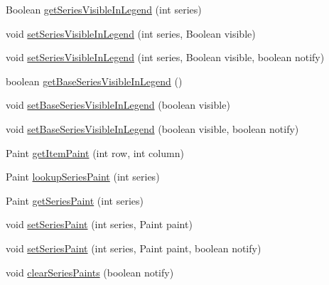\begin{DoxyCompactItemize}
\item 
Boolean \mbox{\hyperlink{classorg_1_1jfree_1_1chart_1_1renderer_1_1_abstract_renderer_aad277f984aba334ec761085b48ace9f5}{get\+Series\+Visible\+In\+Legend}} (int series)
\item 
void \mbox{\hyperlink{classorg_1_1jfree_1_1chart_1_1renderer_1_1_abstract_renderer_ab2f6f64f253e3e762ceb32274d79d6ad}{set\+Series\+Visible\+In\+Legend}} (int series, Boolean visible)
\item 
void \mbox{\hyperlink{classorg_1_1jfree_1_1chart_1_1renderer_1_1_abstract_renderer_a8b13a734cdc2f81e3fc0d3fe019baf78}{set\+Series\+Visible\+In\+Legend}} (int series, Boolean visible, boolean notify)
\item 
boolean \mbox{\hyperlink{classorg_1_1jfree_1_1chart_1_1renderer_1_1_abstract_renderer_a5657ff754b9ff9dc13bac6349ab43012}{get\+Base\+Series\+Visible\+In\+Legend}} ()
\item 
void \mbox{\hyperlink{classorg_1_1jfree_1_1chart_1_1renderer_1_1_abstract_renderer_a9e6708a1410b3575666ecd84f2151f7c}{set\+Base\+Series\+Visible\+In\+Legend}} (boolean visible)
\item 
void \mbox{\hyperlink{classorg_1_1jfree_1_1chart_1_1renderer_1_1_abstract_renderer_a2c9f61e4ce08e12f6f4de7d354da3490}{set\+Base\+Series\+Visible\+In\+Legend}} (boolean visible, boolean notify)
\item 
Paint \mbox{\hyperlink{classorg_1_1jfree_1_1chart_1_1renderer_1_1_abstract_renderer_ae458c0995fdd78cfa69d4a09c63ff036}{get\+Item\+Paint}} (int row, int column)
\item 
Paint \mbox{\hyperlink{classorg_1_1jfree_1_1chart_1_1renderer_1_1_abstract_renderer_abc231547c7d2059d6158ac21bb5826cf}{lookup\+Series\+Paint}} (int series)
\item 
Paint \mbox{\hyperlink{classorg_1_1jfree_1_1chart_1_1renderer_1_1_abstract_renderer_a34de4b630890c8c5ec3b4157cb709ec9}{get\+Series\+Paint}} (int series)
\item 
void \mbox{\hyperlink{classorg_1_1jfree_1_1chart_1_1renderer_1_1_abstract_renderer_a65149cab3fbc60f7e6b1b51fbd5a29ed}{set\+Series\+Paint}} (int series, Paint paint)
\item 
void \mbox{\hyperlink{classorg_1_1jfree_1_1chart_1_1renderer_1_1_abstract_renderer_aad8379727e0dc62165d7e3d61412d53d}{set\+Series\+Paint}} (int series, Paint paint, boolean notify)
\item 
void \mbox{\hyperlink{classorg_1_1jfree_1_1chart_1_1renderer_1_1_abstract_renderer_a57cfc90bf261e1f7b1707c6a803220a1}{clear\+Series\+Paints}} (boolean notify)

\end{DoxyCompactItemize}
